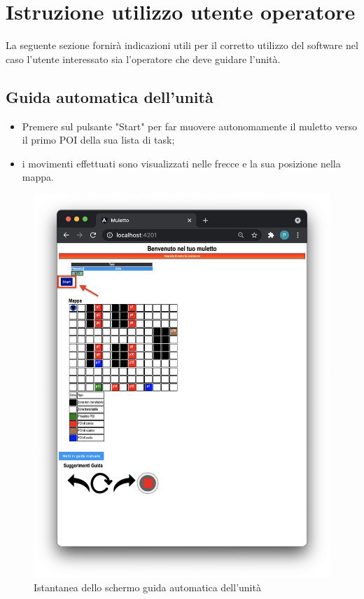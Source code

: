 \section{Istruzione utilizzo utente operatore}
La seguente sezione fornirà indicazioni utili per il corretto utilizzo del software nel caso l'utente interessato sia l'operatore che deve guidare l'unità.

\subsection{Guida automatica dell'unità}
\begin{itemize}
    \item Premere sul pulsante "Start" per far muovere autonomamente il muletto verso il primo POI della sua lista di task;
    \item i movimenti effettuati sono visualizzati nelle frecce e la sua posizione nella mappa.
    
\end{itemize}
\begin{figure}[H]
    \centering
    \includegraphics[scale=0.45]{res/images/forklift_start.png}
    \caption{Istantanea dello schermo guida automatica dell'unità}
\end{figure}
\pagebreak
